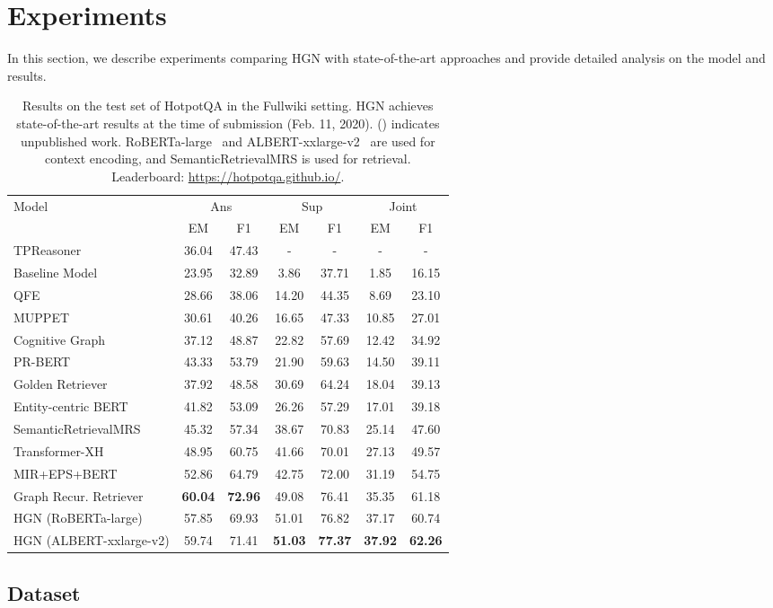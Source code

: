 \documentclass[11pt,a4paper]{article}
\begin{document}
\section{Experiments}
In this section, we describe experiments comparing HGN with state-of-the-art approaches and provide detailed analysis on the model and results.
\begin{table*}[t!]
\centering
\begin{adjustbox}{scale=0.95,center}
\begin{tabular}{lcccccc}
\toprule
\multirow{2}{*}{Model} & \multicolumn{2}{c}{Ans} & \multicolumn{2}{c}{Sup}  & \multicolumn{2}{c}{Joint} \\ & EM & F1 & EM & F1 & EM & F1 \\ \midrule
TPReasoner \cite{xiong2019simple} & 36.04 & 47.43 & - & - & - & - \\ 
Baseline Model  \cite{yang2018hotpotqa}  & 23.95 & 32.89 & 3.86 & 37.71 & 1.85 & 16.15 \\ 
QFE \cite{nishida2019answering} & 28.66 & 38.06 & 14.20 & 44.35 & 8.69 & 23.10 \\
MUPPET \cite{feldman2019multi} & 30.61 & 40.26 & 16.65 & 47.33 & 10.85 & 27.01 \\
Cognitive Graph \cite{ding2019cognitive} & 37.12	& 48.87 & 22.82 & 57.69 & 12.42 & 34.92 \\
PR-BERT & 43.33	& 53.79	& 21.90 & 59.63 & 14.50 & 39.11 \\
Golden Retriever \cite{qi2019answering} & 37.92 & 48.58 & 30.69 & 64.24 & 18.04 & 39.13 \\
Entity-centric BERT \cite{godbole2019multi} & 41.82 & 53.09 & 26.26 & 57.29 & 17.01 & 39.18 \\
SemanticRetrievalMRS \cite{nie2019revealing} & 45.32 & 57.34 & 38.67 & 70.83 & 25.14 & 47.60 \\
Transformer-XH \cite{Zhao2020Transformer-XH:} & 48.95	& 60.75	& 41.66	& 70.01 & 27.13	& 49.57 \\ MIR+EPS+BERT & 52.86 & 64.79 & 42.75 & 72.00 & 31.19 & 54.75 \\
Graph Recur. Retriever \cite{asai2020learning} & \textbf{60.04}	& \textbf{72.96}	& 49.08	& 76.41	& 35.35	& 61.18 \\
\midrule
HGN (RoBERTa-large) & 57.85 & 69.93 & 51.01 & 76.82 & 37.17 & 60.74 \\ 
HGN (ALBERT-xxlarge-v2) & 59.74	& 71.41 & \textbf{51.03} & \textbf{77.37} & \textbf{37.92} & \textbf{62.26} \\
\bottomrule
\end{tabular}
\end{adjustbox}
\caption{\label{tab:leaderboard_fullwiki}
Results on the test set of HotpotQA in the Fullwiki setting. HGN achieves state-of-the-art results at the time of submission (Feb. 11, 2020). () indicates unpublished work. RoBERTa-large~\cite{liu2019roberta} and ALBERT-xxlarge-v2~\cite{Lan2020ALBERT:} are used for context encoding, and SemanticRetrievalMRS is used for retrieval. Leaderboard: \href{https://hotpotqa.github.io/}{https://hotpotqa.github.io/}.}
\end{table*} \subsection{Dataset}
\end{document}
